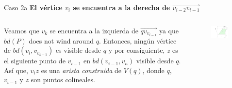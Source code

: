 \documentclass[aspectratio=169,xcolor=dvipsnames, t]{beamer}
\begin{document}
\begin{frame}{Caso 2a}
  \textbf{El vértice $v_{i}$ se encuentra a la derecha de $\overrightarrow{v_{i-2}v_{i-1}}$}\\
  \vspace{0.5cm}
  \begin{columns}
    \begin{column}{0.45\textwidth}
      Veamos que $v_{k}$ se encuentra a la izquierda de $\overrightarrow{qv_{v_{i-1}}}$ ya que $bd(P)$ does not wind around $q$. Entonces, ningún vértice de $bd(v_{i}, v_{v_{k-1}})$ es visible desde $q$ y por consiguiente, $z$ es el siguiente punto de $v_{i-1}$ en $bd(v_{i-1}, v_{n})$ visible desde $q$. Así que, $v_{i}z$ es una \textit{arista construida} de $V(q)$, donde $q$, $v_{i-1}$ y $z$ son puntos colineales.
    \end{column}
    \begin{column}{0.45\textwidth}  %
      \vspace{-1.5cm} %
      \begin{figure}
        \centering
        \includegraphics[width=0.95\textwidth]{imagenes/Caso2.4b.png}
      \end{figure}
    \end{column}
  \end{columns}
\end{frame}

\end{document}
